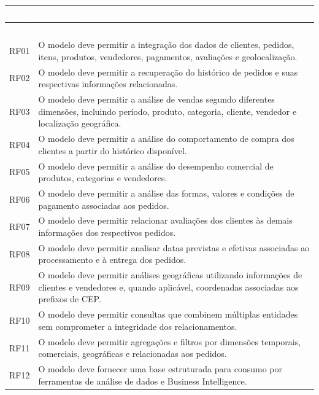 \documentclass[12pt,a4paper]{article}
\begin{document}
\renewcommand{\arraystretch}{1.15}
\begin{longtable}{|>{\RaggedRight\arraybackslash}p{2cm}|>{\RaggedRight\arraybackslash}p{12cm}|}
    \hline
    \rowcolor{AzulCorporativo}
    \textcolor{white}{\textbf{ID}} &
    \textcolor{white}{\textbf{Descrição}} \\ \hline
    \endfirsthead

    \hline
    \rowcolor{AzulCorporativo}
    \textcolor{white}{\textbf{ID}} &
    \textcolor{white}{\textbf{Descrição}} \\ \hline
    \endhead

    RF01 & O modelo deve permitir a integração dos dados de clientes, pedidos, itens, produtos, vendedores, pagamentos, avaliações e geolocalização. \\ \hline

    RF02 & O modelo deve permitir a recuperação do histórico de pedidos e suas respectivas informações relacionadas. \\ \hline

    RF03 & O modelo deve permitir a análise de vendas segundo diferentes dimensões, incluindo período, produto, categoria, cliente, vendedor e localização geográfica. \\ \hline

    RF04 & O modelo deve permitir a análise do comportamento de compra dos clientes a partir do histórico disponível. \\ \hline

    RF05 & O modelo deve permitir a análise do desempenho comercial de produtos, categorias e vendedores. \\ \hline

    RF06 & O modelo deve permitir a análise das formas, valores e condições de pagamento associadas aos pedidos. \\ \hline

    RF07 & O modelo deve permitir relacionar avaliações dos clientes às demais informações dos respectivos pedidos. \\ \hline

    RF08 & O modelo deve permitir analisar datas previstas e efetivas associadas ao processamento e à entrega dos pedidos. \\ \hline

    RF09 & O modelo deve permitir análises geográficas utilizando informações de clientes e vendedores e, quando aplicável, coordenadas associadas aos prefixos de CEP. \\ \hline

    RF10 & O modelo deve permitir consultas que combinem múltiplas entidades sem comprometer a integridade dos relacionamentos. \\ \hline

    RF11 & O modelo deve permitir agregações e filtros por dimensões temporais, comerciais, geográficas e relacionadas aos pedidos. \\ \hline

    RF12 & O modelo deve fornecer uma base estruturada para consumo por ferramentas de análise de dados e Business Intelligence. \\ \hline
\end{longtable}
\end{document}
